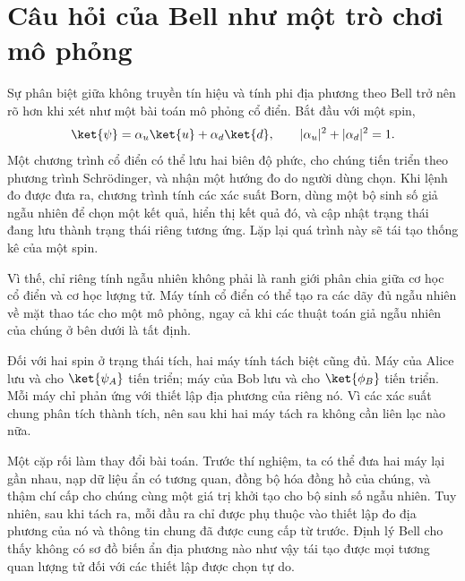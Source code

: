 \begin{classroomqa}
\end{classroomqa}

\section{Câu hỏi của Bell như một trò chơi mô phỏng}

Sự phân biệt giữa không truyền tín hiệu và tính phi địa phương theo Bell trở nên rõ hơn khi xét như một bài toán mô phỏng cổ điển. Bắt đầu với một spin,
\begin{equation}
\ket{\psi}=\alpha_u\ket{u}+\alpha_d\ket{d},
\qquad
|\alpha_u|^2+|\alpha_d|^2=1.
\end{equation}
Một chương trình cổ điển có thể lưu hai biên độ phức, cho chúng tiến triển theo phương trình Schr\"odinger, và nhận một hướng đo do người dùng chọn. Khi lệnh đo được đưa ra, chương trình tính các xác suất Born, dùng một bộ sinh số giả ngẫu nhiên để chọn một kết quả, hiển thị kết quả đó, và cập nhật trạng thái đang lưu thành trạng thái riêng tương ứng. Lặp lại quá trình này sẽ tái tạo thống kê của một spin.

Vì thế, chỉ riêng tính ngẫu nhiên không phải là ranh giới phân chia giữa cơ học cổ điển và cơ học lượng tử. Máy tính cổ điển có thể tạo ra các dãy đủ ngẫu nhiên về mặt thao tác cho một mô phỏng, ngay cả khi các thuật toán giả ngẫu nhiên của chúng ở bên dưới là tất định.

Đối với hai spin ở trạng thái tích, hai máy tính tách biệt cũng đủ. Máy của Alice lưu và cho \(\ket{\psi_A}\) tiến triển; máy của Bob lưu và cho \(\ket{\phi_B}\) tiến triển. Mỗi máy chỉ phản ứng với thiết lập địa phương của riêng nó. Vì các xác suất chung phân tích thành tích, nên sau khi hai máy tách ra không cần liên lạc nào nữa.

Một cặp rối làm thay đổi bài toán. Trước thí nghiệm, ta có thể đưa hai máy lại gần nhau, nạp dữ liệu ẩn có tương quan, đồng bộ hóa đồng hồ của chúng, và thậm chí cấp cho chúng cùng một giá trị khởi tạo cho bộ sinh số ngẫu nhiên. Tuy nhiên, sau khi tách ra, mỗi đầu ra chỉ được phụ thuộc vào thiết lập đo địa phương của nó và thông tin chung đã được cung cấp từ trước. Định lý Bell cho thấy không có sơ đồ biến ẩn địa phương nào như vậy tái tạo được mọi tương quan lượng tử đối với các thiết lập được chọn tự do.

